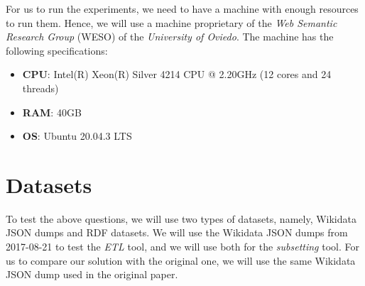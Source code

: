 For us to run the experiments, we need to have a machine with enough resources to run them. Hence, we will use a machine proprietary of the \textit{Web Semantic Research Group} (WESO) of the \textit{University of Oviedo}. The machine has the following specifications:

\begin{itemize}
    \itemsep0.5em
    \item \textbf{CPU}: Intel(R) Xeon(R) Silver 4214 CPU @ 2.20GHz (12 cores and 24 threads)
    \item \textbf{RAM}: 40GB
    \item \textbf{OS}: Ubuntu 20.04.3 LTS
\end{itemize}

\section{Datasets}

To test the above questions, we will use two types of datasets, namely, Wikidata JSON dumps and RDF datasets. We will use the Wikidata JSON dumps from 2017-08-21 to test the \textit{ETL} tool, and we will use both for the \textit{subsetting} tool. For us to compare our solution with the original one, we will use the same Wikidata JSON dump used in the original paper.